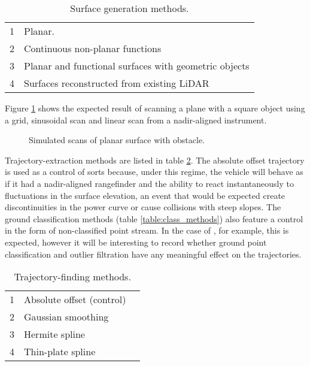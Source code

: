\documentclass[10pt]{article}
\begin{document}
\begin{table}
\caption{Surface generation methods.}
\label{table:ground_types}
\begin{tabular}{r | l}
\hline
1 & Planar. \\
2 & Continuous non-planar functions \\
3 & Planar and functional surfaces with geometric objects \\
4 & Surfaces reconstructed from existing LiDAR \\
\hline
\end{tabular}
\end{table}

Figure \ref{fig:plane_object} shows the expected result of scanning a plane with a square object using a grid, sinusoidal scan and linear scan from a nadir-aligned instrument.

\begin{figure}
\centering
\def\svgscale{0.25}

\def\svgscale{0.25}

\def\svgscale{0.25}

\caption{Simulated scans of planar surface with obstacle.}
\label{fig:plane_object}
\end{figure}


Trajectory-extraction methods are listed in table \ref{table:traj_methods}. The absolute offset trajectory is used as a control of sorts because, under this regime, the vehicle will behave as if it had a nadir-aligned rangefinder and the ability to react instantaneously to fluctuations in the surface elevation, an event that would be expected create discontinuities in the power curve or cause collisions with steep slopes. The ground classification methods  (table \ref{table:class_methods}) also feature a control in the form of non-classified point stream. In the case of \cite{Alqahtani2018}, for example, this is expected, however it will be interesting to record whether ground point classification and outlier filtration have any meaningful effect on the trajectories.

\begin{table}
\caption{Trajectory-finding methods.}
\label{table:traj_methods}
\begin{tabular}{r | l | c}
\hline
1 & Absolute offset (control) & \\
2 & Gaussian smoothing & \cite{Alqahtani2018} \\
3 & Hermite spline &  \cite{Silvan-Cardenas2006} \\
4 & Thin-plate spline & \cite{Hudak2012} \\
\hline
\end{tabular}
\end{table}
\end{document}

